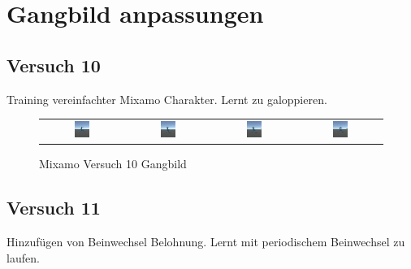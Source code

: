 \section{Gangbild anpassungen}
\subsection{Versuch 10}
Training vereinfachter Mixamo Charakter. Lernt zu galoppieren.

\begin{figure}[H]
  \centering
  \begin{tabular}{cccc}
    \includegraphics[width=0.2\textwidth]{img/mixamo_galoppieren1.png} & \includegraphics[width=0.2\textwidth]{img/mixamo_galoppieren2.png} & \includegraphics[width=0.2\textwidth]{img/mixamo_galoppieren3.png} & \includegraphics[width=0.2\textwidth]{img/mixamo_galoppieren4.png} \\
  \end{tabular}
  \caption{Mixamo Versuch 10 Gangbild}
  \label{fig:mixamo_versuch10_gangbild}
\end{figure}

\subsection{Versuch 11}
Hinzufügen von Beinwechsel Belohnung. Lernt mit periodischem Beinwechsel zu laufen.

